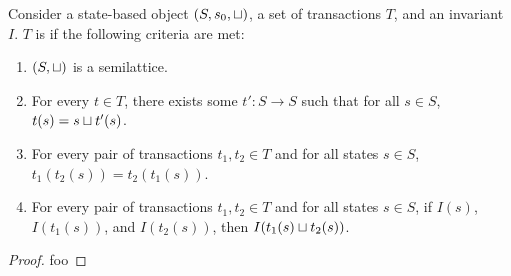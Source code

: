 \begin{claim}
  Consider a state-based object $(S, s_0, \sqcup)$, a set of transactions $T$,
  and an invariant $I$. $T$ is \Iconfluent{} if the following criteria are met:
  \begin{enumerate}
    \item
      $(S, \sqcup)$ is a semilattice.
    \item
      For every $t \in T$, there exists some $t': S \to S$ such that for all
      $s \in S$, $t(s) = s \sqcup t'(s)$.

    \item
      For every pair of transactions $t_1, t_2 \in T$ and for all states $s \in
      S$, $t_1(t_2(s)) = t_2(t_1(s))$.

    \item
      For every pair of transactions $t_1, t_2 \in T$ and for all states $s \in
      S$, if $I(s)$, $I(t_1(s))$, and $I(t_2(s))$, then $I(t_1(s) \sqcup
      t_2(s))$.
  \end{enumerate}
\end{claim}
\begin{proof}
  foo
\end{proof}

